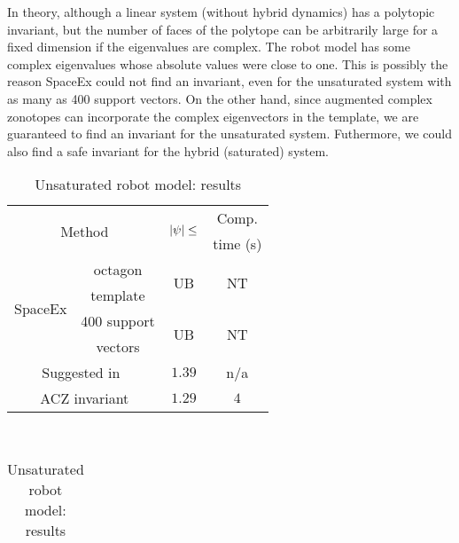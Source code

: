   In theory, although a linear system (without hybrid
dynamics) has a polytopic invariant, but the number of faces of the
polytope can be arbitrarily large for a fixed dimension if the
eigenvalues are complex.  The robot model has some complex eigenvalues
whose absolute values were close to one.  This is possibly the reason
SpaceEx could not find an invariant, even for the unsaturated system
with as many as 400 support vectors.  On the other hand, since
augmented complex zonotopes can incorporate the complex eigenvectors
in the template, we are guaranteed to find an invariant for the
unsaturated system.  Futhermore, we could also find a safe
invariant for the hybrid (saturated) system.

{
\begin{table}
\begin{minipage}{0.48\textwidth}
\centering
\begin{tabular}{|l|c|c|c|}
\hline
\multicolumn{2}{|c|}{\multirow{2}{*}{Method}} &
\multirow{2}{*}{$\left|\psi\right|\leq$} & Comp.\\
\multicolumn{2}{|c|}{} & & time (s)\\
\hline
\multirow{4}{*}{SpaceEx} & octagon & \multirow{2}{*}{UB} & \multirow{2}{*}{NT}\\
& template & & \\
\cline{2-4}
& 400 support & \multirow{2}{*}{UB} & \multirow{2}{*}{NT}\\
& vectors & &\\
\hline
\multicolumn{2}{|c|}{\multirow{2}{*}{Suggested in~\cite{heinz2014benchmark}}} &
\multirow{2}{*}{$1.39$} & \multirow{2}{*}{n/a}\\
\multicolumn{2}{|c|}{} & &\\
\hline
\multicolumn{2}{|c|}{\multirow{2}{*}{ACZ invariant}} & \multirow{2}{*}{$1.29$} &
\multirow{2}{*}{$4$}\\
\multicolumn{2}{|c|}{} & & \\
\hline
\end{tabular}
\caption{Unsaturated robot model: results}
~\label{tab:robot-unsaturated}
\end{minipage}
\hspace{0em}
\begin{minipage}{0.48\textwidth}
\centering
\begin{tabular}{|l|c|c|c|}

\end{tabular}
\end{minipage}
\end{table}}
